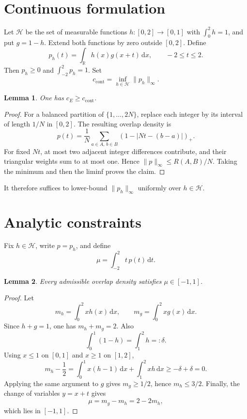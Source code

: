 \documentclass[11pt]{article}
\newtheorem{lemma}{Lemma}
\newcommand{\dd}{\,\mathrm{d}}
\begin{document}
\section{Continuous formulation}

Let $\mathcal H$ be the set of measurable functions
$h:[0,2]\to[0,1]$ with $\int_0^2 h=1$, and put $g=1-h$. Extend both functions
by zero outside $[0,2]$. Define
\[
  p_h(t)=\int_{\mathbb R}h(x)g(x+t)\dd x,\qquad -2\le t\le2.
\]
Then $p_h\ge0$ and $\int_{-2}^{2}p_h=1$. Set
\[
  c_{\mathrm{cont}}=\inf_{h\in\mathcal H}\|p_h\|_\infty.
\]

\begin{lemma}\label{lem:transfer}
One has $c_E\ge c_{\mathrm{cont}}$.
\end{lemma}

\begin{proof}
For a balanced partition of $\{1,\ldots,2N\}$, replace each integer by its
interval of length $1/N$ in $[0,2]$. The resulting overlap density is
\[
  p(t)=\frac1N\sum_{a\in A,\,b\in B}
  (1-|Nt-(b-a)|)_+.
\]
For fixed $Nt$, at most two adjacent integer differences contribute, and
their triangular weights sum to at most one. Hence
$\|p\|_\infty\le R(A,B)/N$. Taking the minimum and then the liminf proves the
claim.
\end{proof}

It therefore suffices to lower-bound $\|p_h\|_\infty$ uniformly over
$h\in\mathcal H$.

\section{Analytic constraints}

Fix $h\in\mathcal H$, write $p=p_h$, and define
\[
  \mu=\int_{-2}^{2}t\,p(t)\dd t.
\]

\begin{lemma}\label{lem:meanrange}
Every admissible overlap density satisfies \(\mu\in[-1,1]\).
\end{lemma}

\begin{proof}
Let
\[
  m_h=\int_0^2 xh(x)\dd x,\qquad
  m_g=\int_0^2 xg(x)\dd x.
\]
Since \(h+g=1\), one has \(m_h+m_g=2\). Also
\[
  \int_0^1(1-h)=\int_1^2h=:\delta.
\]
Using \(x\le1\) on \([0,1]\) and \(x\ge1\) on \([1,2]\),
\[
  m_h-\frac12
  =\int_0^1x(h-1)\dd x+\int_1^2xh\dd x
  \ge-\delta+\delta=0.
\]
Applying the same argument to \(g\) gives \(m_g\ge1/2\), hence
\(m_h\le3/2\). Finally, the change of variables \(y=x+t\) gives
\[
  \mu=m_g-m_h=2-2m_h,
\]
which lies in \([-1,1]\).
\end{proof}
\end{document}
